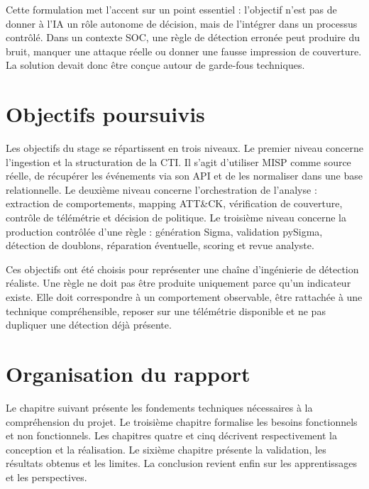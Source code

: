 Cette formulation met l'accent sur un point essentiel : l'objectif n'est pas de donner à l'IA un rôle autonome de décision, mais de l'intégrer dans un processus contrôlé. Dans un contexte SOC, une règle de détection erronée peut produire du bruit, manquer une attaque réelle ou donner une fausse impression de couverture. La solution devait donc être conçue autour de garde-fous techniques.

\section{Objectifs poursuivis}

Les objectifs du stage se répartissent en trois niveaux. Le premier niveau concerne l'ingestion et la structuration de la CTI. Il s'agit d'utiliser MISP comme source réelle, de récupérer les événements via son API et de les normaliser dans une base relationnelle. Le deuxième niveau concerne l'orchestration de l'analyse : extraction de comportements, mapping ATT\&CK, vérification de couverture, contrôle de télémétrie et décision de politique. Le troisième niveau concerne la production contrôlée d'une règle : génération Sigma, validation pySigma, détection de doublons, réparation éventuelle, scoring et revue analyste.

Ces objectifs ont été choisis pour représenter une chaîne d'ingénierie de détection réaliste. Une règle ne doit pas être produite uniquement parce qu'un indicateur existe. Elle doit correspondre à un comportement observable, être rattachée à une technique compréhensible, reposer sur une télémétrie disponible et ne pas dupliquer une détection déjà présente.

\section{Organisation du rapport}

Le chapitre suivant présente les fondements techniques nécessaires à la compréhension du projet. Le troisième chapitre formalise les besoins fonctionnels et non fonctionnels. Les chapitres quatre et cinq décrivent respectivement la conception et la réalisation. Le sixième chapitre présente la validation, les résultats obtenus et les limites. La conclusion revient enfin sur les apprentissages et les perspectives.
